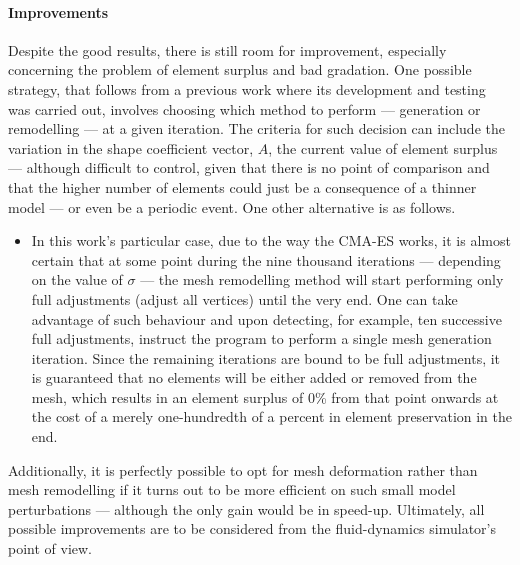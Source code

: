 



\paragraph{Improvements} Despite the good results, there is still room for improvement, especially concerning the problem of element surplus and bad gradation. One possible strategy, that follows from a previous work where its development and testing was carried out, involves choosing which method to perform --- generation or remodelling --- at a given iteration. The criteria for such decision can include the variation in the shape coefficient vector, $A$, the current value of element surplus --- although difficult to control, given that there is no point of comparison and that the higher number of elements could just be a consequence of a thinner model --- or even be a periodic event. One other alternative is as follows.
\begin{itemize}
\item In this work's particular case, due to the way the CMA-ES works, it is almost certain that at some point during the nine thousand iterations --- depending on the value of $\sigma$ --- the mesh remodelling method will start performing only full adjustments (adjust  all vertices) until the very end. One can take advantage of such behaviour and upon detecting, for example, ten successive full adjustments, instruct the program to perform a single mesh generation iteration. Since the remaining iterations are bound to be full adjustments, it is guaranteed that no elements will be either added or removed from the mesh, which results in an element surplus of 0\% from that point onwards at the cost of a merely one-hundredth of a percent in element preservation in the end.
\end{itemize}
Additionally, it is perfectly possible to opt for mesh deformation rather than mesh remodelling if it turns out to be more efficient on such small model perturbations --- although the only gain would be in speed-up. Ultimately, all possible improvements are to be considered from the fluid-dynamics simulator's point of view.